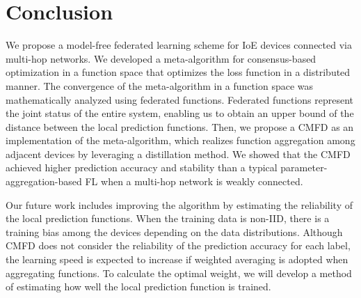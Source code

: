 \documentclass[journal]{IEEEtran}
\begin{document}

\section{Conclusion} \label{sec:conclusion}
We propose a model-free federated learning scheme for \gls{IoE} devices connected via multi-hop networks.
We developed a meta-algorithm for consensus-based optimization in a function space
that optimizes the loss function in a distributed manner.
The convergence of the meta-algorithm in a function space was mathematically analyzed using federated functions.
Federated functions represent the joint status of the entire system,
enabling us to obtain an upper bound of the distance between the local prediction functions.
Then, we propose a \gls{CMFD} as an implementation of the meta-algorithm,
which realizes function aggregation among adjacent devices by leveraging a distillation method.
We showed that the \gls{CMFD} achieved higher prediction accuracy and stability than a typical parameter-aggregation-based \gls{FL}
when a multi-hop network is weakly connected.

Our future work includes improving the algorithm by estimating the reliability of the local prediction functions.
When the training data is non-\gls{IID}, there is a training bias among the devices depending on the data distributions.
Although \gls{CMFD} does not consider the reliability of the prediction accuracy for each label,
the learning speed is expected to increase if weighted averaging is adopted when aggregating functions.
To calculate the optimal weight, we will develop a method of estimating how well the local prediction function is trained.
\end{document}
